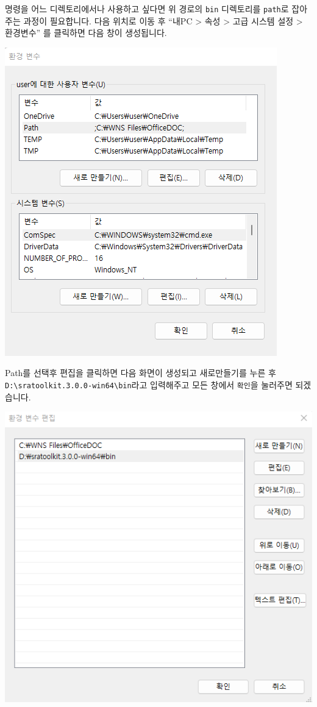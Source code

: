 \documentclass[
]{book}
\begin{document}
명령을 어느 디렉토리에서나 사용하고 싶다면 위 경로의 \texttt{bin} 디렉토리를 \texttt{path}로 잡아주는 과정이 필요합니다. 다음 위치로 이동 후 ``내PC \textgreater{} 속성 \textgreater{} 고급 시스템 설정 \textgreater{} 환경변수'' 를 클릭하면 다음 창이 생성됩니다.

\includegraphics{images/12/env1.png}

Path를 선택후 편집을 클릭하면 다음 화면이 생성되고 새로만들기를 누른 후 \texttt{D:\textbackslash{}sratoolkit.3.0.0-win64\textbackslash{}bin}라고 입력해주고 모든 창에서 \texttt{확인}을 눌러주면 되겠습니다.

\includegraphics{images/12/env2.png}
\end{document}
